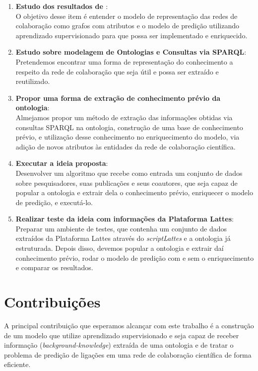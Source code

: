 \begin{enumerate}
    \item \textbf{Estudo dos resultados de \citet{Cervantes2014}}: \\
      O objetivo desse item é entender o modelo de representação das redes de colaboração como grafos com atributos e o modelo de predição utilizando aprendizado supervisionado para que possa ser implementado e enriquecido.
    \item \textbf{Estudo sobre modelagem de Ontologias e Consultas via SPARQL}: \\
      Pretendemos encontrar uma forma de representação do conhecimento a respeito da rede de colaboração que seja útil e possa ser extraído e reutilizado.
    \item \textbf{Propor uma forma de extração de conhecimento prévio da ontologia}: \\
      Almejamos propor um método de extração das informações obtidas via consultas SPARQL na ontologia, construção de uma base de conhecimento prévio, e utilização desse conhecimento no enriquecimento do modelo, via adição de novos atributos às entidades da rede de colaboração científica.
    \item \textbf{Executar a ideia proposta}: \\
      Desenvolver um algoritmo que recebe como entrada um conjunto de dados sobre pesquisadores, suas publicações e seus coautores, que seja capaz de popular a ontologia e extrair dela o conhecimento prévio, enriquecer o modelo de predição, e executá-lo.
    \item \textbf{Realizar teste da ideia com informações da Plataforma Lattes}: \\
      Preparar um ambiente de testes, que contenha um conjunto de dados extraídos da Plataforma Lattes através do \textit{scriptLattes} e a ontologia já estruturada. Depois disso, devemos popular a ontologia e extrair daí conhecimento prévio, rodar o modelo de predição com e sem o enriquecimento e comparar os resultados.
\end{enumerate}

\section{Contribuições}
\label{sec:contribucoes}

A principal contribuição que esperamos alcançar com este trabalho é a construção de um modelo que utilize aprendizado supervisionado e seja capaz de receber informação (\textit{background-knowledge}) extraída de uma ontologia e de tratar o problema de predição de ligações em uma rede de colaboração científica de forma eficiente.

